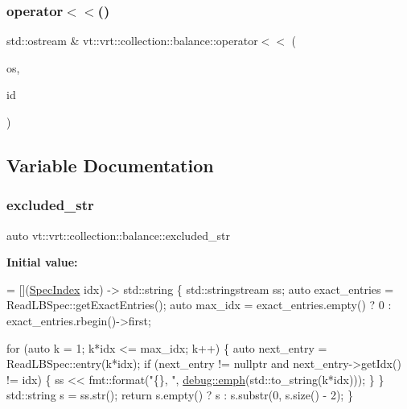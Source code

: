 \subsubsection{\texorpdfstring{operator$<$$<$()}{operator<<()}}
{\footnotesize\ttfamily std\+::ostream \& vt\+::vrt\+::collection\+::balance\+::operator$<$$<$ (\begin{DoxyParamCaption}\item[{std\+::ostream \&}]{os,  }\item[{const \+::\hyperlink{structvt_1_1vrt_1_1collection_1_1balance_1_1_element_i_d_struct}{vt\+::vrt\+::collection\+::balance\+::\+Element\+I\+D\+Struct} \&}]{id }\end{DoxyParamCaption})}



\subsection{Variable Documentation}
\mbox{\label{namespacevt_1_1vrt_1_1collection_1_1balance_af2f6674ecc7191ddbfe31e87569fe334}} 
\subsubsection{\texorpdfstring{excluded\+\_\+str}{excluded\_str}}
{\footnotesize\ttfamily auto vt\+::vrt\+::collection\+::balance\+::excluded\+\_\+str}

{\bfseries Initial value\+:}
\begin{DoxyCode}
= [](\hyperlink{namespacevt_1_1vrt_1_1collection_1_1balance_a72a5e0d9936ddf57f8e6c64e0e9fd123}{SpecIndex} idx) -> std::string \{
  std::stringstream ss;
  \textcolor{keyword}{auto} exact\_entries = ReadLBSpec::getExactEntries();
  \textcolor{keyword}{auto} max\_idx = exact\_entries.empty() ? 0 : exact\_entries.rbegin()->first;

  \textcolor{keywordflow}{for} (\textcolor{keyword}{auto} k = 1; k*idx <= max\_idx; k++) \{
    \textcolor{keyword}{auto} next\_entry = ReadLBSpec::entry(k*idx);
    \textcolor{keywordflow}{if} (next\_entry != \textcolor{keyword}{nullptr} and next\_entry->getIdx() != idx) \{
      ss << fmt::format(\textcolor{stringliteral}{"\{\}, "}, \hyperlink{namespacevt_1_1debug_add365336d7aa2053b5b7588ccad48ac7}{debug::emph}(std::to\_string(k*idx)));
    \}
  \}
  std::string s = ss.str();
  \textcolor{keywordflow}{return} s.empty() ? s : s.substr(0, s.size() - 2);
\}
\end{DoxyCode}
\mbox{\label{namespacevt_1_1vrt_1_1collection_1_1balance_aaed7e09146a45c2932ca185a55161723}} 
